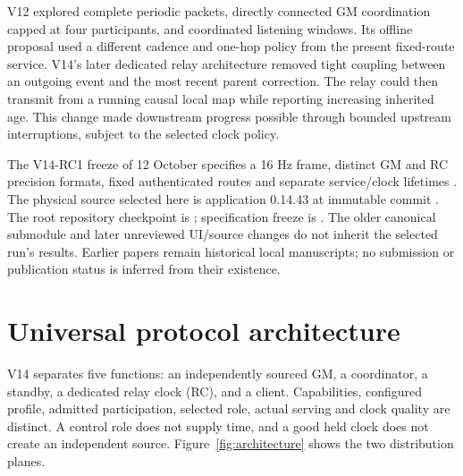 \documentclass[11pt,letterpaper]{article}
\begin{document}
V12 explored complete periodic packets, directly connected GM coordination capped at four participants, and coordinated listening windows. Its offline proposal used a different cadence and one-hop policy from the present fixed-route service. V14's later dedicated relay architecture removed tight coupling between an outgoing event and the most recent parent correction. The relay could then transmit from a running causal local map while reporting increasing inherited age. This change made downstream progress possible through bounded upstream interruptions, subject to the selected clock policy.

The V14-RC1 freeze of 12 October specifies a 16 Hz frame, distinct GM and RC precision formats, fixed authenticated routes and separate service/clock lifetimes \cite{v14}. The physical source selected here is application 0.14.43 at immutable commit . The root repository checkpoint is ; specification freeze is . The older canonical submodule and later unreviewed UI/source changes do not inherit the selected run's results. Earlier papers remain historical local manuscripts; no submission or publication status is inferred from their existence.

\section{Universal protocol architecture}\label{sec:architecture}
V14 separates five functions: an independently sourced GM, a coordinator, a standby, a dedicated relay clock (RC), and a client. Capabilities, configured profile, admitted participation, selected role, actual serving and clock quality are distinct. A control role does not supply time, and a good held clock does not create an independent source. Figure~\ref{fig:architecture} shows the two distribution planes.
\end{document}
